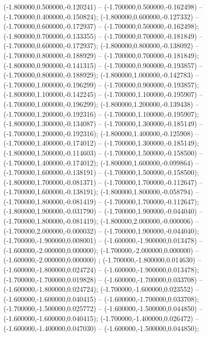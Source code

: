  (-1.800000,0.500000,-0.120241) -- (-1.700000,0.500000,-0.162498) -- (-1.700000,0.400000,-0.150824);
 (-1.800000,0.600000,-0.127332) -- (-1.700000,0.600000,-0.172937) -- (-1.700000,0.500000,-0.162498);
 (-1.800000,0.700000,-0.133355) -- (-1.700000,0.700000,-0.181849) -- (-1.700000,0.600000,-0.172937);
 (-1.800000,0.800000,-0.138092) -- (-1.700000,0.800000,-0.188929) -- (-1.700000,0.700000,-0.181849);
 (-1.800000,0.900000,-0.141315) -- (-1.700000,0.900000,-0.193857) -- (-1.700000,0.800000,-0.188929);
 (-1.800000,1.000000,-0.142783) -- (-1.700000,1.000000,-0.196299) -- (-1.700000,0.900000,-0.193857);
 (-1.800000,1.100000,-0.142245) -- (-1.700000,1.100000,-0.195907) -- (-1.700000,1.000000,-0.196299);
 (-1.800000,1.200000,-0.139438) -- (-1.700000,1.200000,-0.192316) -- (-1.700000,1.100000,-0.195907);
 (-1.800000,1.300000,-0.134087) -- (-1.700000,1.300000,-0.185149) -- (-1.700000,1.200000,-0.192316);
 (-1.800000,1.400000,-0.125908) -- (-1.700000,1.400000,-0.174012) -- (-1.700000,1.300000,-0.185149);
 (-1.800000,1.500000,-0.114603) -- (-1.700000,1.500000,-0.158500) -- (-1.700000,1.400000,-0.174012);
 (-1.800000,1.600000,-0.099864) -- (-1.700000,1.600000,-0.138191) -- (-1.700000,1.500000,-0.158500);
 (-1.800000,1.700000,-0.081371) -- (-1.700000,1.700000,-0.112647) -- (-1.700000,1.600000,-0.138191);
 (-1.800000,1.800000,-0.058794) -- (-1.700000,1.800000,-0.081419) -- (-1.700000,1.700000,-0.112647);
 (-1.800000,1.900000,-0.031790) -- (-1.700000,1.900000,-0.044040) -- (-1.700000,1.800000,-0.081419);
 (-1.800000,2.000000,-0.000006) -- (-1.700000,2.000000,-0.000032) -- (-1.700000,1.900000,-0.044040);
 (-1.700000,-1.900000,0.008001) -- (-1.600000,-1.900000,0.013478) -- (-1.600000,-2.000000,0.000000);
 (-1.700000,-2.000000,0.000000) -- (-1.600000,-2.000000,0.000000) ;
 (-1.700000,-1.800000,0.014630) -- (-1.600000,-1.800000,0.024724) -- (-1.600000,-1.900000,0.013478);
 (-1.700000,-1.700000,0.019828) -- (-1.600000,-1.700000,0.033708) -- (-1.600000,-1.800000,0.024724);
 (-1.700000,-1.600000,0.023552) -- (-1.600000,-1.600000,0.040415) -- (-1.600000,-1.700000,0.033708);
 (-1.700000,-1.500000,0.025772) -- (-1.600000,-1.500000,0.044850) -- (-1.600000,-1.600000,0.040415);
 (-1.700000,-1.400000,0.026472) -- (-1.600000,-1.400000,0.047030) -- (-1.600000,-1.500000,0.044850);
